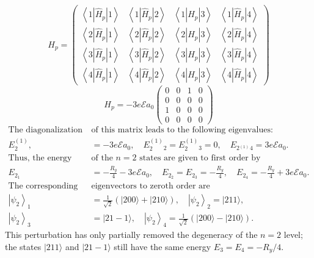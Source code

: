 $$
H_{p}=\left(\begin{array}{ccccc}
\left\langle 1\left|\hat{H}_{p}\right| 1\right\rangle & \left\langle 1\left|\hat{H}_{p}\right| 2\right\rangle & \left\langle 1\left|\hat{H}_{p}\right| 3\right\rangle & \left\langle 1\left|\hat{H}_{p}\right| 4\right\rangle \\
\left\langle 2\left|\hat{H}_{p}\right| 1\right\rangle & \left\langle 2\left|\hat{H}_{p}\right| 2\right\rangle & \left\langle 2\left|\hat{H}_{p}\right| 3\right\rangle & \left\langle 2\left|\hat{H}_{p}\right| 4\right\rangle \\
\left\langle 3\left|\hat{H}_{p}\right| 1\right\rangle & \left\langle 3\left|\hat{H}_{p}\right| 2\right\rangle & \left\langle 3\left|\hat{H}_{p}\right| 3\right\rangle & \left\langle 3\left|\hat{H}_{p}\right| 4\right\rangle \\
\left\langle 4\left|\hat{H}_{p}\right| 1\right\rangle & \left\langle 4\left|\hat{H}_{p}\right| 2\right\rangle & \left\langle 4\left|\hat{H}_{p}\right| 3\right\rangle & \left\langle 4\left|\hat{H}_{p}\right| 4\right\rangle
\end{array}\right)
$$
$$H_{p}=-3 e \mathcal{E} a_{0}\left(\begin{array}{cccc}
	0 & 0 & 1 & 0 \\
	0 & 0 & 0 & 0 \\
	1 & 0 & 0 & 0 \\
	0 & 0 & 0 & 0
\end{array}\right)$$
\begin{align*}
\text{The diagonalization }&\text{of this matrix leads to the following eigenvalues:}\\
E_{2}^{(1)},&=-3 e \mathcal{E} a_{0}, \quad E_{2}^{(1)}{ }_{2}=E_{2}^{(1)}{ }_{3}=0, \quad E_{2{ }^{(1)}}{ }_{4}=3 e \mathcal{E} a_{0} .\\
\text{Thus, the energy levels }&\text{of the $n=2$ states are given to first order by}\\
E_{2_{1}}&=-\frac{R_{y}}{4}-3 e \mathcal{E} a_{0}, \quad E_{2_{2}}=E_{2_{3}}=-\frac{R_{y}}{4}, \quad E_{2_{4}}=-\frac{R_{y}}{4}+3 e \mathcal{E} a_{0} .\\
\text{The corresponding }&\text{eigenvectors to zeroth order are}\\
\left|\psi_{2}\right\rangle_{1}&=\frac{1}{\sqrt{2}}(|200\rangle+|210\rangle), \quad\left|\psi_{2}\right\rangle_{2}=|211\rangle, \\
\left|\psi_{2}\right\rangle_{3}&=|21-1\rangle, \quad\left|\psi_{2}\right\rangle_{4}=\frac{1}{\sqrt{2}}(|200\rangle-|210\rangle) .
\end{align*}
This perturbation has only partially removed the degeneracy of the $n=2$ level; the states $|211\rangle$ and $|21-1\rangle$ still have the same energy $E_{3}=E_{4}=-R_{y} / 4$.

